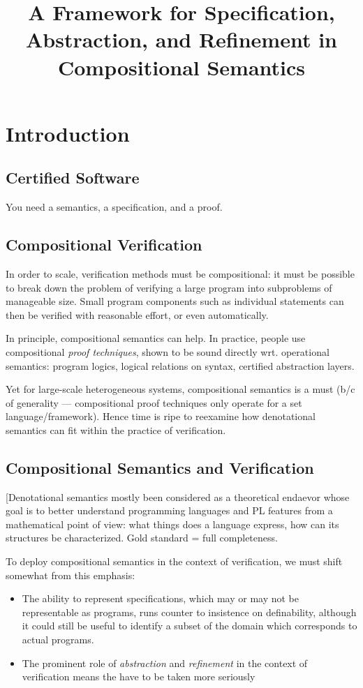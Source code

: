 \documentclass[sigplan,10pt,review,anonymous]{acmart}
\title{%
  A Framework for Specification, Abstraction, and Refinement
  in Compositional Semantics}
\begin{document}
\maketitle

\section{Introduction} %

\subsection{Certified Software}

You need a semantics, a specification, and a proof.

\subsection{Compositional Verification}

In order to scale,
verification methods must be compositional:
it must be possible to break down the problem of verifying a large program
into subproblems of manageable size.
Small program components such as individual statements
can then be verified with reasonable effort, or even automatically.

In principle,
compositional semantics can help.
In practice,
people use compositional \emph{proof techniques},
shown to be sound directly wrt. operational semantics:
program logics,
logical relations on syntax,
certified abstraction layers.

Yet for large-scale heterogeneous systems,
compositional semantics is a must (b/c of generality ---
compositional proof techniques only operate
for a set language/framework).
Hence time is ripe to reexamine how
denotational semantics can fit within the practice of verification.

\subsection{Compositional Semantics and Verification}

[Denotational semantics mostly been considered
as a theoretical endaevor whose goal is to
better understand programming languages and PL features
from a mathematical point of view:
what things does a language express,
how can its structures be characterized.
Gold standard = full completeness.

To deploy compositional semantics in the context of verification,
we must shift somewhat from this emphasis:
\begin{itemize}
  \item The ability to represent specifications,
    which may or may not be representable as programs,
    runs counter to insistence on definability,
    although it could still be useful to identify
    a subset of the domain which corresponds to
    actual programs.
  \item The prominent role of \emph{abstraction} and \emph{refinement}
    in the context of verification
    means the have to be taken more seriously
\end{itemize}
\end{document}
